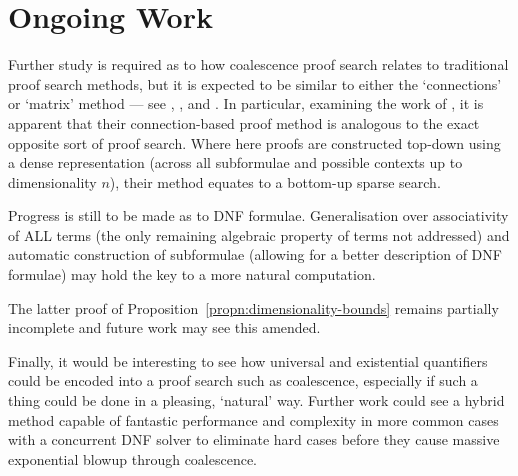     \section*{Ongoing Work}
        Further study is required as to how coalescence proof search relates to traditional proof search methods, but it is expected to be similar to either the `connections' or `matrix' method --- see \citet{tableaux-for-logic-of-proofs}, \citet{matrices-with-connections}, and \citet{proving-by-matings}.
        In particular, examining the work of \citet{connection-based-proof-method}, it is apparent that their connection-based proof method is analogous to the exact opposite sort of proof search.
        Where here proofs are constructed top-down using a dense representation (across all subformulae and possible contexts up to dimensionality $n$), their method equates to a bottom-up sparse search.

        Progress is still to be made as to DNF formulae.
        Generalisation over associativity of ALL terms (the only remaining algebraic property of terms not addressed) and automatic construction of subformulae (allowing for a better description of DNF formulae) may hold the key to a more natural computation.
        
        The latter proof of Proposition~\ref{propn:dimensionality-bounds} remains partially incomplete and future work may see this amended.

        Finally, it would be interesting to see how universal and existential quantifiers could be encoded into a proof search such as coalescence, especially if such a thing could be done in a pleasing, `natural' way.
        Further work could see a hybrid method capable of fantastic performance and complexity in more common cases with a concurrent DNF solver to eliminate hard cases before they cause massive exponential blowup through coalescence.
